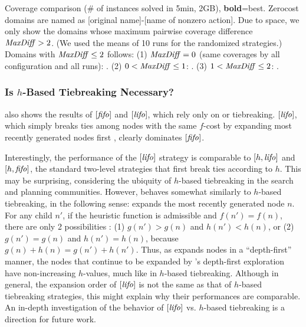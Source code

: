 \begin{table}[htb]
 \centering
  \setlength{\tabcolsep}{0.3em}
 
 \caption{Coverage comparison (\# of instances solved in 5min, 2GB), \textbf{bold}=best. Zerocost domains are named as [original name]-[name of nonzero action]. Due to space, we only show the domains whose maximum pairwise coverage difference $\mit{MaxDiff}>2$. (We used the means of 10 runs for the randomized strategies.) Domains with $\mit{MaxDiff}\leq 2$ follows:
 (1) $\mit{MaxDiff} = 0$ (same coverages by all configuration and all runs): .
 (2) $0 < \mit{MaxDiff} \leq 1$: .
 (3) $1 < \mit{MaxDiff} \leq 2$: .
 }\label{tbl:depth}
\end{table}

\subsubsection{Is $h$-Based Tiebreaking Necessary?}
\label{sec:h-necessary}
 also shows the results of $[\fifo]$ and $[\lifo]$,
which rely only on \fifo or \lifo tiebreaking.
$[\lifo]$, which simply breaks ties among nodes with the same $f$-cost by expanding most recently generated nodes first \cite{korf1985depth}, clearly dominates $[\fifo]$.

Interestingly, the performance of the $[\lifo]$ strategy
is comparable to $[h,\lifo]$ and $[h,\fifo]$, the standard two-level strategies that first break ties according to $h$.
This may be surprising, considering the ubiquity of $h$-based tiebreaking in the search and planning communities.
% 
However, \lifo behaves somewhat similarly to $h$-based tiebreaking, in the following sense:
\lifo expands the most recently generated node $n$.
For any child $n'$, 
if the heuristic function is admissible and $f(n') = f(n)$, there are only 2 possibilities :
(1) $g(n') > g(n)$ and $h(n') < h(n)$, or
(2) $g(n') = g(n)$ and $h(n') = h(n)$,
because $g(n)+h(n)=g(n')+h(n')$.
Thus, as \lifo expands nodes in a ``depth-first'' manner,
the nodes that continue to be expanded by \lifo's depth-first
exploration have non-increasing $h$-values, much like in $h$-based tiebreaking.
Although in general, the expansion order of $[\lifo]$ is not the same 
as that of $h$-based tiebreaking strategies,
this might explain why their performances are comparable.
An in-depth investigation of the behavior of $[\lifo]$ vs. $h$-based tiebreaking is a direction for future work.

